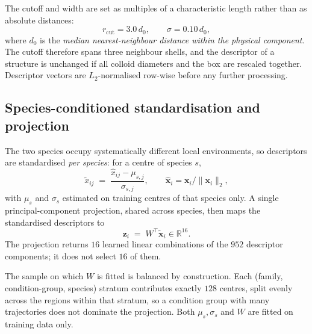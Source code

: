 The cutoff and width are set as multiples of a characteristic length rather than as absolute
distances:
\begin{equation}
  r_{\mathrm{cut}} = 3.0\, d_0, \qquad \sigma = 0.10\, d_0 ,
\end{equation}
where $d_0$ is the \emph{median nearest-neighbour distance within the physical component}.
The cutoff therefore spans three neighbour shells, and the descriptor of a structure is
unchanged if all colloid diameters and the box are rescaled together. Descriptor vectors are
$L_2$-normalised row-wise before any further processing.


\subsection{Species-conditioned standardisation and projection}
\label{sec:pca}

The two species occupy systematically different local environments, so descriptors are
standardised \emph{per species}: for a centre of species $s$,
\begin{equation}
  \tilde{x}_{ij} \;=\; \frac{\hat{x}_{ij} - \mu_{s,j}}{\sigma_{s,j}},
  \qquad \hat{\bm{x}}_i = \bm{x}_i / \lVert \bm{x}_i \rVert_2 ,
  \label{eq:standardise}
\end{equation}
with $\mu_s$ and $\sigma_s$ estimated on training centres of that species only. A single
principal-component projection, shared across species, then maps the standardised
descriptors to
\begin{equation}
  \bm{z}_i \;=\; W^{\top} \tilde{\bm{x}}_i \in \mathbb{R}^{16}.
  \label{eq:pca}
\end{equation}
The projection returns $16$ learned linear combinations of the $952$ descriptor components;
it does not select $16$ of them.

The sample on which $W$ is fitted is balanced by construction. Each
(family, condition-group, species) stratum contributes exactly $128$ centres, split evenly
across the regions within that stratum, so a condition group with many trajectories does not
dominate the projection. Both $\mu_s, \sigma_s$ and $W$ are fitted on training data only.

